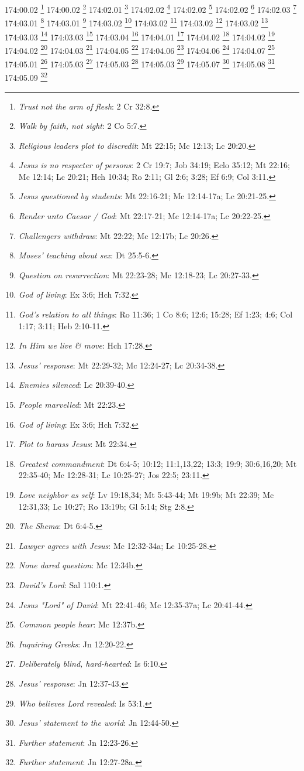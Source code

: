 174:00.02 \footnote{\textit{Trust not the arm of flesh}: 2 Cr 32:8.}
174:00.02 \footnote{\textit{Walk by faith, not sight}: 2 Co 5:7.}
174:02.01 \footnote{\textit{Religious leaders plot to discredit}: Mt 22:15; Mc 12:13; Lc 20:20.}
174:02.02 \footnote{\textit{Jesus is no respecter of persons}: 2 Cr 19:7; Job 34:19; Eclo 35:12; Mt 22:16; Mc 12:14; Lc 20:21; Hch 10:34; Ro 2:11; Gl 2:6; 3:28; Ef 6:9; Col 3:11.}
174:02.02 \footnote{\textit{Jesus questioned by students}: Mt 22:16-21; Mc 12:14-17a; Lc 20:21-25.}
174:02.02 \footnote{\textit{Render unto Caesar / God}: Mt 22:17-21; Mc 12:14-17a; Lc 20:22-25.}
174:02.03 \footnote{\textit{Challengers withdraw}: Mt 22:22; Mc 12:17b; Lc 20:26.}
174:03.01 \footnote{\textit{Moses' teaching about sex}: Dt 25:5-6.}
174:03.01 \footnote{\textit{Question on resurrection}: Mt 22:23-28; Mc 12:18-23; Lc 20:27-33.}
174:03.02 \footnote{\textit{God of living}: Ex 3:6; Hch 7:32.}
174:03.02 \footnote{\textit{God's relation to all things}: Ro 11:36; 1 Co 8:6; 12:6; 15:28; Ef 1:23; 4:6; Col 1:17; 3:11; Heb 2:10-11.}
174:03.02 \footnote{\textit{In Him we live & move}: Hch 17:28.}
174:03.02 \footnote{\textit{Jesus' response}: Mt 22:29-32; Mc 12:24-27; Lc 20:34-38.}
174:03.03 \footnote{\textit{Enemies silenced}: Lc 20:39-40.}
174:03.03 \footnote{\textit{People marvelled}: Mt 22:23.}
174:03.04 \footnote{\textit{God of living}: Ex 3:6; Hch 7:32.}
174:04.01 \footnote{\textit{Plot to harass Jesus}: Mt 22:34.}
174:04.02 \footnote{\textit{Greatest commandment}: Dt 6:4-5; 10:12; 11:1,13,22; 13:3; 19:9; 30:6,16,20; Mt 22:35-40; Mc 12:28-31; Lc 10:25-27; Jos 22:5; 23:11.}
174:04.02 \footnote{\textit{Love neighbor as self}: Lv 19:18,34; Mt 5:43-44; Mt 19:9b; Mt 22:39; Mc 12:31,33; Lc 10:27; Ro 13:19b; Gl 5:14; Stg 2:8.}
174:04.02 \footnote{\textit{The Shema}: Dt 6:4-5.}
174:04.03 \footnote{\textit{Lawyer agrees with Jesus}: Mc 12:32-34a; Lc 10:25-28.}
174:04.05 \footnote{\textit{None dared question}: Mc 12:34b.}
174:04.06 \footnote{\textit{David's Lord}: Sal 110:1.}
174:04.06 \footnote{\textit{Jesus "Lord" of David}: Mt 22:41-46; Mc 12:35-37a; Lc 20:41-44.}
174:04.07 \footnote{\textit{Common people hear}: Mc 12:37b.}
174:05.01 \footnote{\textit{Inquiring Greeks}: Jn 12:20-22.}
174:05.03 \footnote{\textit{Deliberately blind, hard-hearted}: Is 6:10.}
174:05.03 \footnote{\textit{Jesus' response}: Jn 12:37-43.}
174:05.03 \footnote{\textit{Who believes Lord revealed}: Is 53:1.}
174:05.07 \footnote{\textit{Jesus' statement to the world}: Jn 12:44-50.}
174:05.08 \footnote{\textit{Further statement}: Jn 12:23-26.}
174:05.09 \footnote{\textit{Further statement}: Jn 12:27-28a.}
